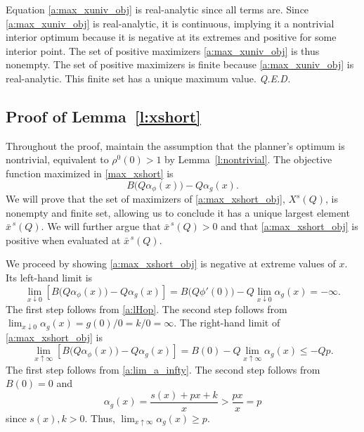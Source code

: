 \documentclass[12pt]{article}
\renewcommand{\qed}{{\it Q.E.D.}}
\newcommand{\efficacy}{\phi}
\newcommand{\general}{g}
\newcommand{\benefit}{B}
\newcommand{\ratio}{\rho^0\!}
\newcommand{\Xshort}{X^{s}}
\newcommand{\xshortbar}{\bar{x}^{\,s}}
\newcommand{\perunit}[1]{\alpha_{#1}}
\begin{document}
Equation \eqref{a:max_xuniv_obj} is real-analytic since all terms
are. Since \eqref{a:max_xuniv_obj} is real-analytic, it is continuous,
implying it a nontrivial interior optimum because it is negative at
its extremes and positive for some interior point. The set of positive
maximizers \eqref{a:max_xuniv_obj} is thus nonempty. The set of
positive maximizers is finite because \eqref{a:max_xuniv_obj} is
real-analytic. This finite set has a unique maximum value. \qed


\subsection*{Proof of Lemma~\ref{l:xshort}}

Throughout the proof, maintain the assumption that the planner's
optimum is nontrivial, equivalent to $\ratio(0) > 1$ by
Lemma~\ref{l:nontrivial}.  The objective function maximized in
\eqref{max_xshort} is
\begin{equation}
\label{a:max_xshort_obj}
\benefit \bigl( Q\perunit{\efficacy}\!(x) \bigr) - Q
\perunit{\general}\!(x).
\end{equation}
We will prove that the set of maximizers of \eqref{a:max_xshort_obj},
$\Xshort\!(Q)$, is nonempty and finite set, allowing us to conclude it
has a unique largest element $\xshortbar\!(Q)$. We will further argue
that $\xshortbar\!(Q) > 0$ and that \eqref{a:max_xshort_obj} is
positive when evaluated at $\xshortbar\!(Q)$.

We proceed by showing \eqref{a:max_xshort_obj} is negative at extreme
values of $x$.  Its left-hand limit is
\begin{equation}
\label{a:short_left_limit}
\lim_{x \downarrow 0} \left[ \benefit \bigl( Q\perunit{\efficacy}\!(x)
  \bigr) - Q \perunit{\general}\!(x) \right] = \benefit \bigl(
Q\efficacy'(0) \bigr) - Q \lim_{x \downarrow 0}
\perunit{\general}\!(x) = - \infty.
\end{equation}
The first step follows from \eqref{a:lHop}. The second step follows
from $\lim_{x \downarrow 0} \perunit{\general}\!(x) = \general(0) / 0
= k / 0 = \infty$.  The right-hand limit of \eqref{a:max_xshort_obj}
is
\begin{equation}
 \label{a:short_right_limit1}
\lim_{x \uparrow \infty} \left[ \benefit \bigl(
  Q\perunit{\efficacy}\!(x) \bigr) - Q \perunit{\general}\!(x) \right]
= \benefit(0) - Q \lim_{x \uparrow \infty} \perunit{\general}\!(x)
\leq - Qp.
\end{equation}
The first step follows from \eqref{a:lim_a_infty}. The second step
follows from $\benefit(0) = 0$ and
\begin{equation}
\label{a:average_g_limit}
\perunit{\general}(x) = \frac{s(x) + px + k}{x} > \frac{px}{x} = p
\end{equation}
since $s(x), k > 0$. Thus, $\lim_{x \uparrow \infty}
\perunit{\general}\!(x) \geq p$.
\end{document}
